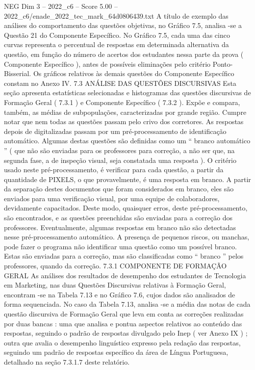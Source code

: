 \begin{textsample}{NEG Dim 3 – 2022\_c6 – Score 5.00 – 2022\_c6/enade\_2022\_tec\_mark\_64d0806439.txt}
A título de exemplo das análises do comportamento das questões objetivas, no Gráfico 7.5, analisa -se a Questão 21 do Componente Específico.
No Gráfico 7.5, cada uma das cinco curvas representa o percentual de respostas em determinada alternativa da questão, em função do número de acertos dos estudantes nessa parte da prova ( Componente Específico ), antes de possíveis eliminações pelo critério Ponto-Bisserial.
Os gráficos relativos às demais questões do Componente Específico constam no Anexo IV. 7.3 ANÁLISE DAS QUESTÕES DISCURSIVAS Esta seção apresenta estatísticas selecionadas e histogramas das questões discursivas de Formação Geral ( 7.3.1 ) e Componente Específico ( 7.3.2 ).
Expõe e compara, também, as médias de subpopulações, caracterizadas por grande região.
Cumpre notar que nem todas as questões passam pelo crivo dos corretores.
As respostas depois de digitalizadas passam por um pré-processamento de identificação automático.
Algumas destas questões são definidas como um “ branco automático ” ( que não são enviadas para os professores para correção, a não ser que, na segunda fase, a de inspeção visual, seja constatada uma resposta ).
O critério usado neste pré-processamento, é verificar para cada questão, a partir da quantidade de PIXELS, o que provavelmente, é uma resposta em branco.
A partir da separação destes documentos que foram considerados em branco, eles são enviados para uma verificação visual, por uma equipe de colaboradores, devidamente capacitados.
Deste modo, quaisquer erros, deste pré-processamento, são encontrados, e as questões preenchidas são enviadas para a correção dos professores.
Eventualmente, algumas respostas em branco não são detectadas nesse pré-processamento automático.
A presença de pequenos riscos, ou manchas, pode fazer o programa não identificar uma questão como um possível branco.
Estas são enviadas para a correção, mas são classificadas como “ branco ” pelos professores, quando da correção. 7.3.1 COMPONENTE DE FORMAÇÃO GERAL As análises dos resultados de desempenho dos estudantes de Tecnologia em Marketing, nas duas Questões Discursivas relativas à Formação Geral, encontram -se na Tabela 7.13 e no Gráfico 7.6, cujos dados são analisados de forma sequenciada.
No caso da Tabela 7.13, analisa -se a média das notas de cada questão discursiva de Formação Geral que leva em conta as correções realizadas por duas bancas : uma que analisa e pontua aspectos relativos ao conteúdo das respostas, seguindo o padrão de respostas divulgado pelo Inep ( ver Anexo IX ) ; outra que avalia o desempenho linguístico expresso pela redação das respostas, seguindo um padrão de respostas específico da área de Língua Portuguesa, detalhado na seção 7.3.1.7 deste relatório.

\end{textsample}
